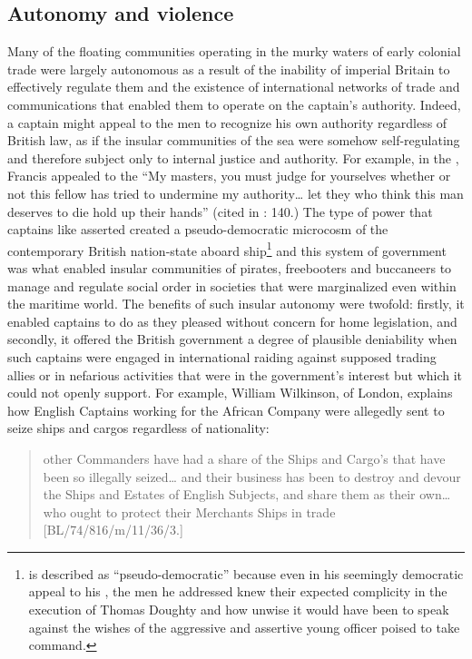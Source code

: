 \subsection{{Autonomy and violence}}%

Many of the floating communities operating in the murky waters of early colonial trade were largely autonomous as a result of the inability of imperial Britain to effectively regulate them and the existence of international networks of  trade and communications that enabled them to operate on the captain’s authority. Indeed, a captain might appeal to the men to recognize his own authority regardless of British law, as if the insular communities of the sea were somehow self-regulating and therefore subject only to internal justice and authority. For example, in the , Francis  appealed to the  “My masters, you must judge for yourselves whether or not this fellow has tried to undermine my authority… let they who think this man deserves to die hold up their hands” (cited in \citealt{Bicheno2012}: 140.) The type of power that captains like  asserted created a pseudo-democratic microcosm of the contemporary British nation-state aboard ship\footnote{ is described as “pseudo-democratic” because even in his seemingly democratic appeal to his , the men he addressed knew their expected complicity in the execution of Thomas Doughty and how unwise it would have been to speak against the wishes of the aggressive and assertive young officer poised to take command.}  and this system of government was what enabled insular communities of pirates, freebooters and buccaneers to manage and regulate social order in societies that were marginalized even within the maritime world. The benefits of such insular autonomy were twofold: firstly, it enabled captains to do as they pleased without concern for home legislation, and secondly, it offered the British government a degree of plausible deniability when such captains were engaged in international raiding against supposed trading allies or in nefarious activities that were in the government’s interest but which it could not openly support. For example, William Wilkinson,  of London, explains how English Captains working for the African Company were allegedly sent to seize  ships and cargos regardless of nationality: 

\begin{quotation}
other Commanders have had a share of the Ships and Cargo’s that have been so illegally seized… and their business has been to destroy and devour the Ships and Estates of English Subjects, and share them as their own… who ought to protect their Merchants Ships in trade [BL/74/816/m/11/36/3.] 
\end{quotation}

